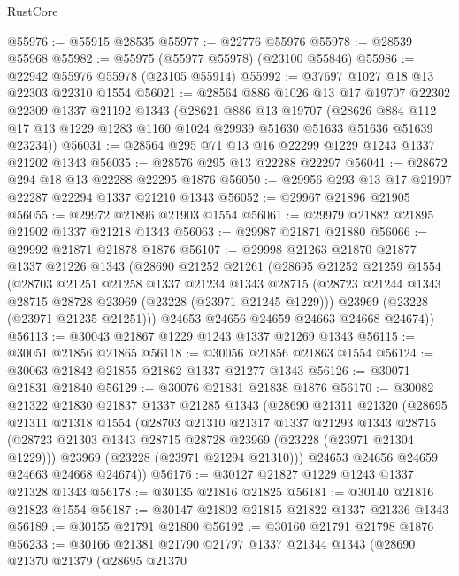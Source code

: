 \begin{lexlean}{RustCore}
\begin{coremodule}
@55976 := @55915 @28535
@55977 := @22776 @55976
@55978 := @28539 @55968
@55982 := @55975 (@55977 @55978) (@23100 @55846)
@55986 := @22942 @55976 @55978 (@23105 @55914)
@55992 := @37697 @1027 @18 @13 @22303 @22310 @1554
@56021 := @28564
    @886
    @1026
    @13
    @17
    @19707
    @22302
    @22309
    @1337
    @21192
    @1343
    (@28621
      @886
      @13
      @19707
      (@28626 @884 @112 @17 @13 @1229 @1283 @1160 @1024 @29939 @51630 @51633 @51636 @51639 @23234))
@56031 := @28564 @295 @71 @13 @16 @22299 @1229 @1243 @1337 @21202 @1343
@56035 := @28576 @295 @13 @22288 @22297
@56041 := @28672 @294 @18 @13 @22288 @22295 @1876
@56050 := @29956 @293 @13 @17 @21907 @22287 @22294 @1337 @21210 @1343
@56052 := @29967 @21896 @21905
@56055 := @29972 @21896 @21903 @1554
@56061 := @29979 @21882 @21895 @21902 @1337 @21218 @1343
@56063 := @29987 @21871 @21880
@56066 := @29992 @21871 @21878 @1876
@56107 := @29998
    @21263
    @21870
    @21877
    @1337
    @21226
    @1343
    (@28690
      @21252
      @21261
      (@28695
        @21252
        @21259
        @1554
        (@28703
          @21251
          @21258
          @1337
          @21234
          @1343
          @28715
          (@28723 @21244 @1343 @28715 @28728 @23969 (@23228 (@23971 @21245 @1229)))
          @23969
          (@23228 (@23971 @21235 @21251)))
        @24653
        @24656
        @24659
        @24663
        @24668
        @24674))
@56113 := @30043 @21867 @1229 @1243 @1337 @21269 @1343
@56115 := @30051 @21856 @21865
@56118 := @30056 @21856 @21863 @1554
@56124 := @30063 @21842 @21855 @21862 @1337 @21277 @1343
@56126 := @30071 @21831 @21840
@56129 := @30076 @21831 @21838 @1876
@56170 := @30082
    @21322
    @21830
    @21837
    @1337
    @21285
    @1343
    (@28690
      @21311
      @21320
      (@28695
        @21311
        @21318
        @1554
        (@28703
          @21310
          @21317
          @1337
          @21293
          @1343
          @28715
          (@28723 @21303 @1343 @28715 @28728 @23969 (@23228 (@23971 @21304 @1229)))
          @23969
          (@23228 (@23971 @21294 @21310)))
        @24653
        @24656
        @24659
        @24663
        @24668
        @24674))
@56176 := @30127 @21827 @1229 @1243 @1337 @21328 @1343
@56178 := @30135 @21816 @21825
@56181 := @30140 @21816 @21823 @1554
@56187 := @30147 @21802 @21815 @21822 @1337 @21336 @1343
@56189 := @30155 @21791 @21800
@56192 := @30160 @21791 @21798 @1876
@56233 := @30166
    @21381
    @21790
    @21797
    @1337
    @21344
    @1343
    (@28690
      @21370
      @21379
      (@28695
        @21370

\end{coremodule}
\end{lexlean}
